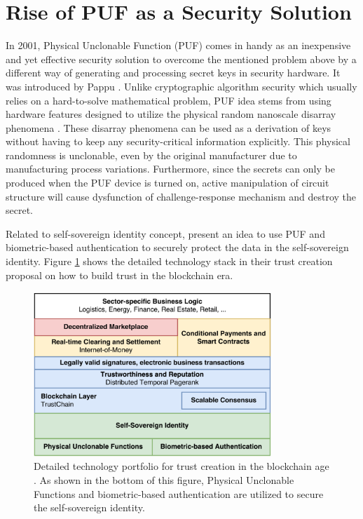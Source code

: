 \section{Rise of PUF as a Security Solution}
\label{ris_puf}
In 2001, Physical Unclonable Function (PUF) comes in handy as an inexpensive and yet effective security solution to overcome the mentioned problem above by a different way of generating and processing secret keys in security hardware. It was introduced by Pappu \cite{Pappu2026}. Unlike cryptographic algorithm security which usually relies on a hard-to-solve mathematical problem, PUF idea stems from using hardware features designed to utilize the physical random nanoscale disarray phenomena \cite{retrospective}. These disarray phenomena can be used as a derivation of keys without having to keep any security-critical information explicitly. This physical randomness is unclonable, even by the original manufacturer due to manufacturing process variations. Furthermore, since the secrets can only be produced when the PUF device is turned on, active manipulation of circuit structure will cause dysfunction of challenge-response mechanism and destroy the secret.

Related to self-sovereign identity concept, \cite{pouwelse} present an idea to use PUF and biometric-based authentication to securely protect the data in the self-sovereign identity. Figure \ref{fig:trust-creation} shows the detailed technology stack in their trust creation proposal on how to build trust in the blockchain era.

\begin{figure}[tph!]
    \centerline{\includegraphics[width={0.8\textwidth}]{images/stack_ssi}}
    \caption{Detailed technology portfolio for trust creation in the blockchain age \cite{pouwelse}. As shown in the bottom of this figure, Physical Unclonable Functions and biometric-based authentication are utilized to secure the self-sovereign identity.}
    \label{fig:trust-creation}
\end{figure}

